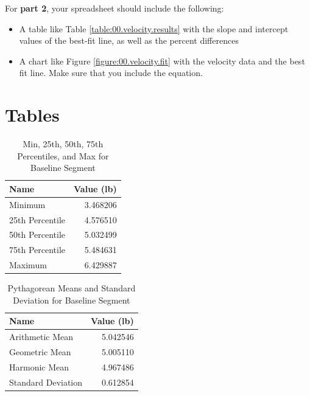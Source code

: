 For \textbf{part 2}, your spreadsheet should include the following:
\begin{itemize}
    \item A table like Table \ref{table:00.velocity.results} with the slope and intercept values of the best-fit line, as well as the percent differences
    \item A chart like Figure \ref{figure:00.velocity.fit} with the velocity data and the best fit line. Make sure that you include the equation.
\end{itemize}
\newpage
\section{Tables}
\begin{table}[ht]
    \centering
    \begin{tabular}{|l|r|}
        \hline
        \textbf{Name} & \textbf{Value (lb)} \\
        \hline
		Minimum & 3.468206 \\
		25th Percentile & 4.576510 \\
		50th Percentile & 5.032499 \\
		75th Percentile & 5.484631 \\
		Maximum & 6.429887 \\
		\hline
	\end{tabular}
    \caption{Min, 25th, 50th, 75th Percentiles, and Max for Baseline Segment}
    \label{table:00.baseline.descriptive}
\end{table}
\begin{table}[ht]
    \centering
    \begin{tabular}{|l|r|}
        \hline
		\textbf{Name} & \textbf{Value (lb)} \\
        \hline
		Arithmetic Mean & 5.042546 \\
		Geometric Mean & 5.005110 \\
        Harmonic Mean & 4.967486 \\
        \hline
        Standard Deviation & 0.612854 \\
		\hline
	\end{tabular}
    \caption{Pythagorean Means and Standard Deviation for Baseline Segment}
    \label{table:00.baseline.means}
\end{table}
